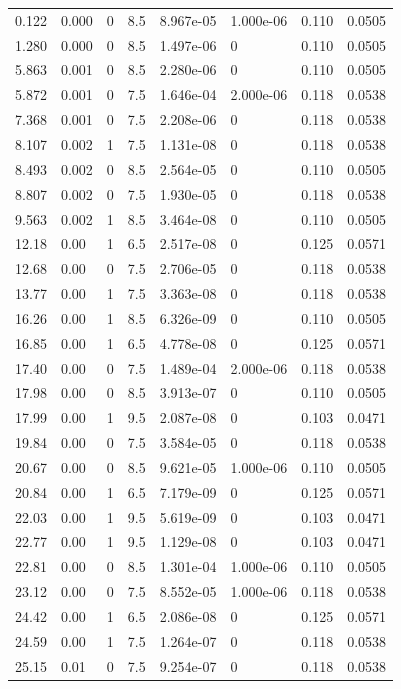 \documentclass[preview]{standalone}
\begin{document}
{{\begin{tabular}{L{1.2cm}C{1.2cm} C{0.3cm}C{0.5cm} C{1.4cm}C{1.4cm} C{1.4cm}C{1.4cm}}
  0.122  &  0.000  & 0     & 8.5 &  8.967e-05  & 1.000e-06  & 0.110 &  0.0505   \\ 
  1.280  &  0.000  & 0     & 8.5 &  1.497e-06  & 0  & 0.110 &  0.0505   \\ 
  5.863  &  0.001  & 0     & 8.5 &  2.280e-06  & 0  & 0.110 &  0.0505   \\ 
  5.872  &  0.001  & 0     & 7.5 &  1.646e-04  & 2.000e-06  & 0.118 &  0.0538   \\ 
  7.368  &  0.001  & 0     & 7.5 &  2.208e-06  & 0  & 0.118 &  0.0538   \\ 
  8.107  &  0.002  & 1     & 7.5 &  1.131e-08  & 0  & 0.118 &  0.0538   \\ 
  8.493  &  0.002  & 0     & 8.5 &  2.564e-05  & 0  & 0.110 &  0.0505   \\ 
  8.807  &  0.002  & 0     & 7.5 &  1.930e-05  & 0  & 0.118 &  0.0538   \\ 
  9.563  &  0.002  & 1     & 8.5 &  3.464e-08  & 0  & 0.110 &  0.0505   \\ 
  12.18  &  0.00  & 1     & 6.5 &  2.517e-08  & 0  & 0.125 &  0.0571   \\ 
  12.68  &  0.00  & 0     & 7.5 &  2.706e-05  & 0  & 0.118 &  0.0538   \\ 
  13.77  &  0.00  & 1     & 7.5 &  3.363e-08  & 0  & 0.118 &  0.0538   \\ 
  16.26  &  0.00  & 1     & 8.5 &  6.326e-09  & 0  & 0.110 &  0.0505   \\ 
  16.85  &  0.00  & 1     & 6.5 &  4.778e-08  & 0  & 0.125 &  0.0571   \\ 
  17.40  &  0.00  & 0     & 7.5 &  1.489e-04  & 2.000e-06  & 0.118 &  0.0538   \\ 
  17.98  &  0.00  & 0     & 8.5 &  3.913e-07  & 0  & 0.110 &  0.0505   \\ 
  17.99  &  0.00  & 1     & 9.5 &  2.087e-08  & 0  & 0.103 &  0.0471   \\ 
  19.84  &  0.00  & 0     & 7.5 &  3.584e-05  & 0  & 0.118 &  0.0538   \\ 
  20.67  &  0.00  & 0     & 8.5 &  9.621e-05  & 1.000e-06  & 0.110 &  0.0505   \\ 
  20.84  &  0.00  & 1     & 6.5 &  7.179e-09  & 0  & 0.125 &  0.0571   \\ 
  22.03  &  0.00  & 1     & 9.5 &  5.619e-09  & 0  & 0.103 &  0.0471   \\ 
  22.77  &  0.00  & 1     & 9.5 &  1.129e-08  & 0  & 0.103 &  0.0471   \\ 
  22.81  &  0.00  & 0     & 8.5 &  1.301e-04  & 1.000e-06  & 0.110 &  0.0505   \\ 
  23.12  &  0.00  & 0     & 7.5 &  8.552e-05  & 1.000e-06  & 0.118 &  0.0538   \\ 
  24.42  &  0.00  & 1     & 6.5 &  2.086e-08  & 0  & 0.125 &  0.0571   \\ 
  24.59  &  0.00  & 1     & 7.5 &  1.264e-07  & 0  & 0.118 &  0.0538   \\ 
  25.15  &  0.01  & 0     & 7.5 &  9.254e-07  & 0  & 0.118 &  0.0538   \\ 
\hline 
\end{tabular} 

}}
\end{document}
